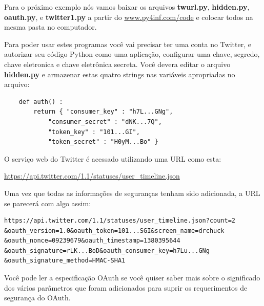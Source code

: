 Para o próximo exemplo nós vamos baixar os arquivos
{\bf twurl.py}, {\bf hidden.py}, 
{\bf oauth.py}, 
e
{\bf twitter1.py} a partir do 
\url{www.py4inf.com/code} e colocar todos na mesma pasta
no computador.

Para poder usar estes programas você vai precisar ter uma conta
no Twitter, e autorizar seu código Python como uma aplicação,
configurar uma chave, segredo, chave eletronica e chave eletrônica
secreta. Você devera editar o arquivo {\bf hidden.py} e armazenar
estas quatro strings nas variáveis apropriadas no arquivo:

\beforeverb
\begin{verbatim}
    def auth() :
        return { "consumer_key" : "h7L...GNg",
            "consumer_secret" : "dNK...7Q",
            "token_key" : "101...GI",
            "token_secret" : "H0yM...Bo" }
\end{verbatim}
\afterverb
%
O serviço web do Twitter é acessado utilizando uma URL como esta:

\url{https://api.twitter.com/1.1/statuses/user_timeline.json}

Uma vez que todas as informações de seguranças tenham sido adicionada,
a URL se parecerá com algo assim:

\beforeverb
\begin{verbatim}
https://api.twitter.com/1.1/statuses/user_timeline.json?count=2
&oauth_version=1.0&oauth_token=101...SGI&screen_name=drchuck
&oauth_nonce=09239679&oauth_timestamp=1380395644
&oauth_signature=rLK...BoD&oauth_consumer_key=h7Lu...GNg
&oauth_signature_method=HMAC-SHA1
\end{verbatim}
\afterverb
%
Você pode ler a especificação OAuth se você quiser saber mais
sobre o significado dos vários parâmetros que foram adicionados
para suprir os requerimentos de segurança do OAuth.


